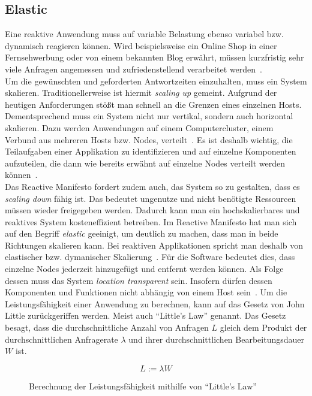\subsection{Elastic}\label{subsec:elastic}
Eine reaktive Anwendung muss auf variable Belastung ebenso variabel bzw. dynamisch reagieren können. Wird beispielsweise ein Online Shop in einer Fernsehwerbung oder von einem bekannten Blog erwährt, müssen kurzfristig sehr viele Anfragen angemessen und zufriedenstellend verarbeitet werden~\cite[S.~39]{kuhn_reactive_2015}.\\
Um die gewünschten und geforderten Antwortzeiten einzuhalten, muss ein System skalieren. Traditionellerweise ist hiermit \textit{scaling up} gemeint. Aufgrund der heutigen Anforderungen stößt man schnell an die Grenzen eines einzelnen Hosts. Dementsprechend muss ein System nicht nur vertikal, sondern auch horizontal skalieren. Dazu werden Anwendungen auf einem Computercluster, einem Verbund aus mehreren Hosts bzw. Nodes, verteilt~\cite[S.~7]{vernon_reactive_2016}. Es ist deshalb wichtig, die Teilaufgaben einer Applikation zu identifizieren und auf einzelne Komponenten aufzuteilen, die dann wie bereits erwähnt auf einzelne Nodes verteilt werden können~\cite[S.~40]{kuhn_reactive_2015}.\\
Das Reactive Manifesto fordert zudem auch, das System so zu gestalten, dass es \textit{scaling down} fähig ist. Das bedeutet ungenutze und nicht benötigte Ressourcen müssen wieder freigegeben werden. Dadurch kann man ein hochskalierbares und reaktives System kosteneffizient betreiben. Im Reactive Manifesto hat man sich auf den Begriff \textit{elastic} geeinigt, um deutlich zu machen, dass man in beide Richtungen skalieren kann. Bei reaktiven Applikationen spricht man deshalb von elastischer bzw. dymanischer Skalierung~\cite[S.~8]{vernon_reactive_2016}. Für die Software bedeutet dies, dass einzelne Nodes jederzeit hinzugefügt und entfernt werden können. Als Folge dessen muss das System \textit{location transparent} sein. Insofern dürfen dessen Komponenten und Funktionen nicht abhängig von einem Host sein~\cite[S.~8]{vernon_reactive_2016}. 
Um die Leistungsfähigkeit einer Anwendung zu berechnen, kann auf das Gesetz von John Little zurückgeriffen werden. Meist auch \enquote{Little's Law} genannt. Das Gesetz besagt, dass die durchschnittliche Anzahl von Anfragen $L$ gleich dem Produkt der durchschnittlichen Anfragerate $\lambda$ und ihrer durchschnittlichen Bearbeitungsdauer $W$ ist.

\begin{figure}[H]
  \[L := \lambda W\]
  \caption{Berechnung der Leistungsfähigkeit mithilfe von \enquote{Little's Law}}
\end{figure}

